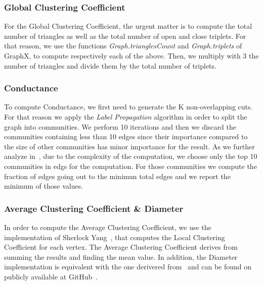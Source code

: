 \subsubsection{Global Clustering Coefficient}
For the Global Clustering Coefficient, the urgent matter is to compute the total number of triangles as well as the total number of open and close triplets. For that reason, we use the functions \textit{Graph.trianglesCount} and \textit{Graph.triplets} of GraphX, to compute respectively each of the above. Then, we multiply with 3 the number of triangles and divide them by the total number of triplets.

\subsubsection{Conductance}
To compute Conductance, we first need to generate the K non-overlapping cuts. For that reason we apply the \textit{Label Propagation} algorithm in order to split the graph into communities. We perform 10 iterations and then we discard the communities containing less than 10 edges since their importance compared to the size of other communities has minor importance for the result. As we further analyze in~, due to the complexity of the computation, we choose only the top 10 communities in edgs for the computation. For those communities we compute the fraction of edges going out to the minimun total edges and we report the minimum of those values.

\subsubsection{Average Clustering Coefficient \& Diameter}
In order to compute the Average Clustering Coefficient, we use the implementation of Sherlock Yang~\cite{localCCgit}, that computes the Local Clustering Coefficient for each vertex. The Average Clustering Coefficient derives from summing the results and finding the mean value. In addition, the Diameter implementation is equivalent with the one derivered from~\cite{diam1, diam2} and can be found on publicly available at GitHub~\cite{diamGit}.


